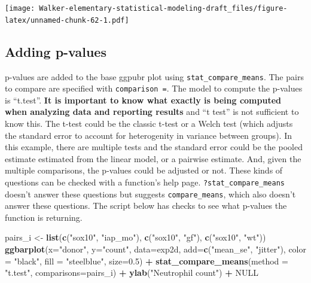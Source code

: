 \documentclass[]{book}
\newenvironment{Shaded}{\begin{snugshade}}{\end{snugshade}}
\newcommand{\KeywordTok}[1]{\textcolor[rgb]{0.13,0.29,0.53}{\textbf{#1}}}
\newcommand{\DataTypeTok}[1]{\textcolor[rgb]{0.13,0.29,0.53}{#1}}
\newcommand{\FloatTok}[1]{\textcolor[rgb]{0.00,0.00,0.81}{#1}}
\newcommand{\StringTok}[1]{\textcolor[rgb]{0.31,0.60,0.02}{#1}}
\newcommand{\OtherTok}[1]{\textcolor[rgb]{0.56,0.35,0.01}{#1}}
\newcommand{\OperatorTok}[1]{\textcolor[rgb]{0.81,0.36,0.00}{\textbf{#1}}}
\newcommand{\NormalTok}[1]{#1}
\begin{document}
\texttt{[image: Walker-elementary-statistical-modeling-draft\_files/figure-latex/unnamed-chunk-62-1.pdf]}

\subsection{Adding p-values}\label{adding-p-values}

p-values are added to the base ggpubr plot using
\texttt{stat\_compare\_means}. The pairs to compare are specified with
\texttt{comparison\ =}. The model to compute the p-values is ``t.test''.
\textbf{It is important to know what exactly is being computed when
analyzing data and reporting results} and ``t test'' is not sufficient
to know this. The t-test could be the classic t-test or a Welch test
(which adjusts the standard error to account for heterogenity in
variance between groups). In this example, there are multiple tests and
the standard error could be the pooled estimate estimated from the
linear model, or a pairwise estimate. And, given the multiple
comparisons, the p-values could be adjusted or not. These kinds of
questions can be checked with a function's help page.
\texttt{?stat\_compare\_means} doesn't answer these questions but
suggests \texttt{compare\_means}, which also doesn't answer these
questions. The script below has checks to see what p-values the function
is returning.

\begin{Shaded}
\begin{Highlighting}[]
\NormalTok{pairs_i <-}\StringTok{ }\KeywordTok{list}\NormalTok{(}\KeywordTok{c}\NormalTok{(}\StringTok{"sox10"}\NormalTok{, }\StringTok{"iap_mo"}\NormalTok{), }\KeywordTok{c}\NormalTok{(}\StringTok{"sox10"}\NormalTok{, }\StringTok{"gf"}\NormalTok{), }\KeywordTok{c}\NormalTok{(}\StringTok{"sox10"}\NormalTok{, }\StringTok{"wt"}\NormalTok{))}
\KeywordTok{ggbarplot}\NormalTok{(}\DataTypeTok{x=}\StringTok{"donor"}\NormalTok{, }
          \DataTypeTok{y=}\StringTok{"count"}\NormalTok{, }
          \DataTypeTok{data=}\NormalTok{exp2d,}
          \DataTypeTok{add=}\KeywordTok{c}\NormalTok{(}\StringTok{"mean_se"}\NormalTok{, }\StringTok{"jitter"}\NormalTok{),}
          \DataTypeTok{color =} \StringTok{"black"}\NormalTok{,}
          \DataTypeTok{fill =} \StringTok{"steelblue"}\NormalTok{,}
          \DataTypeTok{size=}\FloatTok{0.5}\NormalTok{) }\OperatorTok{+}
\StringTok{  }\KeywordTok{stat_compare_means}\NormalTok{(}\DataTypeTok{method =} \StringTok{"t.test"}\NormalTok{, }\DataTypeTok{comparisons=}\NormalTok{pairs_i) }\OperatorTok{+}
\StringTok{  }\KeywordTok{ylab}\NormalTok{(}\StringTok{"Neutrophil count"}\NormalTok{) }\OperatorTok{+}
\StringTok{  }\OtherTok{NULL}
\end{Highlighting}
\end{Shaded}
\end{document}
